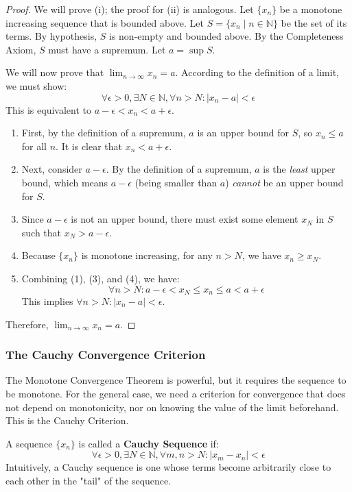 \begin{proof}
We will prove (i); the proof for (ii) is analogous.
Let $\{x_n\}$ be a monotone increasing sequence that is bounded above. Let $S = \{x_n \mid n \in \mathbb{N}\}$ be the set of its terms.
By hypothesis, $S$ is non-empty and bounded above.
By the Completeness Axiom, $S$ must have a supremum. Let $a = \sup S$.

We will now prove that $\lim_{n \to \infty} x_n = a$.
According to the definition of a limit, we must show:
\[
\forall \epsilon > 0, \exists N \in \mathbb{N}, \forall n > N: |x_n - a| < \epsilon
\]
This is equivalent to $a - \epsilon < x_n < a + \epsilon$.

\begin{enumerate}
    \item First, by the definition of a supremum, $a$ is an upper bound for $S$, so $x_n \leq a$ for all $n$. It is clear that $x_n < a + \epsilon$.
    \item Next, consider $a - \epsilon$. By the definition of a supremum, $a$ is the \textit{least} upper bound, which means $a - \epsilon$ (being smaller than $a$) \textit{cannot} be an upper bound for $S$.
    \item Since $a - \epsilon$ is not an upper bound, there must exist some element $x_N$ in $S$ such that $x_N > a - \epsilon$.
    \item Because $\{x_n\}$ is monotone increasing, for any $n > N$, we have $x_n \geq x_N$.
    \item Combining (1), (3), and (4), we have:
    \[
    \forall n > N: a - \epsilon < x_N \leq x_n \leq a < a + \epsilon
    \]
    This implies $\forall n > N: |x_n - a| < \epsilon$.
\end{enumerate}
Therefore, $\lim_{n \to \infty} x_n = a$.
\end{proof}

\subsubsection{The Cauchy Convergence Criterion}

The Monotone Convergence Theorem is powerful, but it requires the sequence to be monotone. For the general case, we need a criterion for convergence that does not depend on monotonicity, nor on knowing the value of the limit beforehand. This is the Cauchy Criterion.

\begin{definition}
A sequence $\{x_n\}$ is called a \textbf{Cauchy Sequence} if:
\[
\forall \epsilon > 0, \exists N \in \mathbb{N}, \forall m, n > N: |x_m - x_n| < \epsilon
\]
Intuitively, a Cauchy sequence is one whose terms become arbitrarily close to each other in the "tail" of the sequence.
\end{definition}

